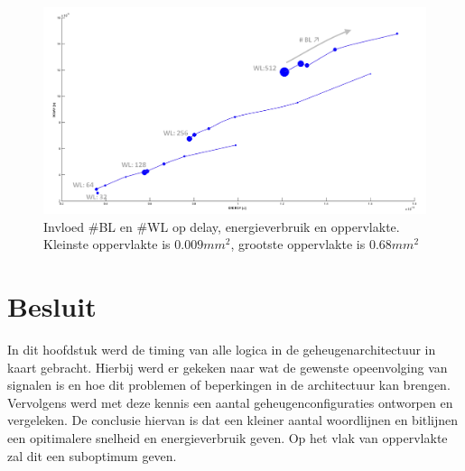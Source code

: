 \begin{figure}[!ht]
  \centering
  \includegraphics[scale=0.6]{../fig/hfdstk-timing-all-sol2.png}
  \caption[Delay,energieverbruik en oppervlakte van alle geheugenconfiguraties]{Invloed \#BL en \#WL op delay, energieverbruik en oppervlakte. Kleinste oppervlakte is $0.009mm^{2}$, grootste oppervlakte is $0.68mm^{2}$}
  \label{fig:final20all2}
\end{figure} 

\section{Besluit}
In dit hoofdstuk werd de timing van alle logica in de geheugenarchitectuur in kaart gebracht. Hierbij werd er gekeken naar wat de gewenste opeenvolging van signalen is en hoe dit problemen of beperkingen in de architectuur kan brengen. Vervolgens werd met deze kennis een aantal geheugenconfiguraties ontworpen en vergeleken. De conclusie hiervan is dat een kleiner aantal woordlijnen en bitlijnen een opitimalere snelheid en energieverbruik geven. Op het vlak van oppervlakte zal dit een suboptimum geven.
